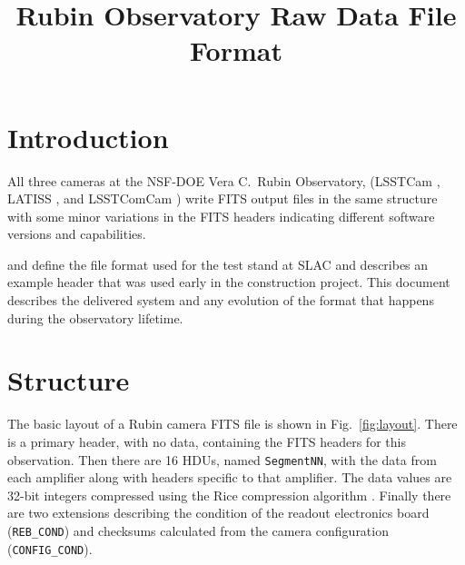 \documentclass[OPS,lsstdraft,authoryear,toc]{lsstdoc}
\title{Rubin Observatory Raw Data File Format}
\date{\vcsDate}
\begin{document}
\maketitle


\section{Introduction}

All three cameras at the NSF-DOE Vera C.\ Rubin Observatory, (LSSTCam \citep{10.71929/rubin/2571927}, LATISS \citep{10.71929/rubin/2571930}, and LSSTComCam \citep{10.71929/rubin/2561361}) write FITS output files in the same structure with some minor variations in the FITS headers indicating different software versions and capabilities.

 and  define the file format used for the test stand at SLAC and  describes an example header that was used early in the construction project.
This document describes the delivered system and any evolution of the format that happens during the observatory lifetime.

\section{Structure}

The basic layout of a Rubin camera FITS file is shown in Fig.~\ref{fig:layout}.
There is a primary header, with no data, containing the FITS headers for this observation.
Then there are 16 HDUs, named \texttt{SegmentNN}, with the data from each amplifier along with headers specific to that amplifier.
The data values are 32-bit integers compressed using the Rice compression algorithm \citep{2012arXiv1201.1336W}.
Finally there are two extensions describing the condition of the readout electronics board (\texttt{REB\_COND}) and checksums calculated from the camera configuration (\texttt{CONFIG\_COND}).
\end{document}
